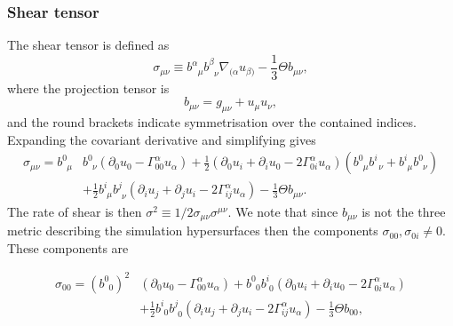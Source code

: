 \documentclass[a4paper]{article}
\newcommand{\ph}{\phantom}
\newcommand{\alp}{\alpha}
\newcommand{\Gam}{\Gamma}
\newcommand{\pd}{\partial}
\begin{document}
\subsubsection{Shear tensor}

The shear tensor is defined as
\begin{equation}\label{eq:sigma_defn}
	\sigma_{\mu\nu} \equiv b^\alp_{\ph{\alp}\mu} b^\beta_{\ph{\beta}\nu} \nabla_{(\alp} u_{\beta)} - \frac{1}{3}\Theta b_{\mu\nu},
\end{equation}
where the projection tensor is 
\begin{equation}\label{eq:bproj}
	b_{\mu\nu}=g_{\mu\nu} + u_\mu u_\nu,
\end{equation}
and the round brackets indicate symmetrisation over the contained indices. Expanding the covariant derivative and simplifying gives
\begin{equation}
	\begin{aligned}
		\sigma_{\mu\nu} = b^0_{\ph{0}\mu} &b^0_{\ph{0}\nu}  \left( \pd_0 u_0 - \Gam^\alp_{00} u_\alp \right) + \frac{1}{2} \left( \pd_0 u_i + \pd_i u_0 - 2 \Gam^\alp_{0i} u_\alp \right) \left( b^0_{\ph{0}\mu} b^i_{\ph{0}\nu} + b^i_{\ph{i}\mu} b^0_{\ph{0}\nu} \right) \\
					& + \frac{1}{2} b^i_{\ph{i}\mu} b^j_{\ph{j}\nu} \left( \pd_i u_j + \pd_j u_i - 2 \Gam^\alp_{ij} u_\alp \right) - \frac{1}{3}\Theta b_{\mu\nu}.
	\end{aligned}
\end{equation}
The rate of shear is then $\sigma^2 \equiv 1/2 \sigma_{\mu\nu} \sigma^{\mu\nu}$. We note that since $b_{\mu\nu}$ is not the three metric describing the simulation hypersurfaces then the components $\sigma_{00}, \sigma_{0i} \neq 0$. These components are

\begin{equation}
	\begin{aligned}
		\sigma_{00} = \left(b^0_{\ph{0}0}\right)^2 &\left( \pd_0 u_0 - \Gam^\alp_{00} u_\alp \right) + b^0_{\ph{0}0} b^i_{\ph{i}0} \left( \pd_0 u_i + \pd_i u_0 - 2 \Gam^\alp_{0i} u_\alp \right) \\
		&+ \frac{1}{2} b^i_{\ph{i}0} b^j_{\ph{j}0} \left( \pd_i u_j + \pd_j u_i - 2 \Gam^\alp_{ij} u_\alp \right) - \frac{1}{3}\Theta b_{00},
	\end{aligned}
\end{equation}
\end{document}
